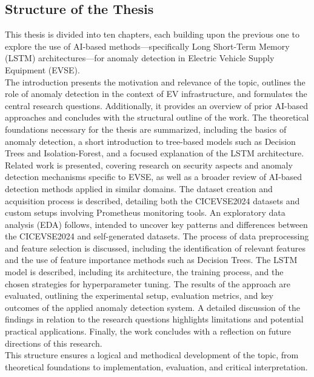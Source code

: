 \subsection{Structure of the Thesis}

This thesis is divided into ten chapters, each building upon the previous one to explore the use of AI-based methods—specifically Long Short-Term Memory (LSTM) architectures—for anomaly detection in Electric Vehicle Supply Equipment (EVSE).\\

The introduction presents the motivation and relevance of the topic, outlines the role of anomaly detection in the context of EV infrastructure, and formulates the central research questions. Additionally, it provides an overview of prior AI-based approaches and concludes with the structural outline of the work. The theoretical foundations necessary for the thesis are summarized, including the basics of anomaly detection, a short introduction to tree-based models such as Decision Trees and Isolation-Forest, and a focused explanation of the LSTM architecture. Related work is presented, covering research on security aspects and anomaly detection mechanisms specific to EVSE, as well as a broader review of AI-based detection methods applied in similar domains. The dataset creation and acquisition process is described, detailing both the CICEVSE2024 datasets and custom setups involving Prometheus monitoring tools. An exploratory data analysis (EDA) follows, intended to uncover key patterns and differences between the CICEVSE2024 and self-generated datasets. The process of data preprocessing and feature selection is discussed, including the identification of relevant features and the use of feature importance methods such as Decision Trees. The LSTM model is described, including its architecture, the training process, and the chosen strategies for hyperparameter tuning. The results of the approach are evaluated, outlining the experimental setup, evaluation metrics, and key outcomes of the applied anomaly detection system. A detailed discussion of the findings in relation to the research questions highlights limitations and potential practical applications. Finally, the work concludes with a reflection on future directions of this research.\\

This structure ensures a logical and methodical development of the topic, from theoretical foundations to implementation, evaluation, and critical interpretation.
